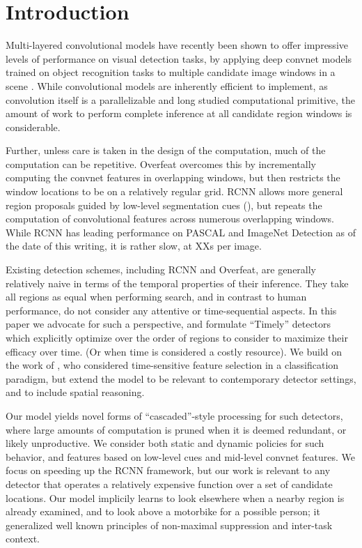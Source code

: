 \section{Introduction}\label{introduction}

Multi-layered convolutional models have recently been shown to offer impressive levels of performance on visual detection tasks, by applying deep convnet models trained on object recognition tasks to multiple candidate image windows in a scene \cite{Sermanet-ICLR-2014,Girshick-CVPR-2014}.
While convolutional models are inherently efficient to implement, as convolution itself is a parallelizable and long studied computational primitive, the amount of work to perform complete inference at all candidate region windows is considerable.

Further, unless care is taken in the design of the computation, much of the computation can be repetitive.
Overfeat overcomes this by incrementally computing the convnet features in overlapping windows, but then restricts the window locations to be on a relatively regular grid. RCNN allows more general region proposals guided by low-level segmentation cues (\cite{Uijlings-IJCV-2013}), but repeats the computation of convolutional features across numerous overlapping windows.
While RCNN has leading performance on PASCAL and ImageNet Detection as of the date of this writing, it is rather slow, at XXs per image.

Existing detection schemes, including RCNN and Overfeat, are generally relatively naive in terms of the temporal properties of their inference.
They take all regions as equal when performing search, and in contrast to human performance, do not consider any attentive or time-sequential aspects.
In this paper we advocate for such a perspective, and formulate ``Timely'' detectors which explicitly optimize over the order of regions to consider to maximize their efficacy over time.
(Or when time is considered a costly resource).
We build on the work of \cite{Karayev-NIPS-2012}, who considered time-sensitive feature selection in a classification paradigm, but extend the model to be relevant to contemporary detector settings, and to include spatial reasoning.

Our model yields novel forms of ``cascaded''-style processing for such detectors, where large amounts of computation is pruned when it is deemed redundant, or likely unproductive.
We consider both static and dynamic policies for such behavior, and features based on low-level cues and mid-level convnet features.
We focus on speeding up the RCNN framework, but our work is relevant to any detector that operates a relatively expensive function over a set of candidate locations.
Our model implicily learns to look elsewhere when a nearby region is already examined, and to look above a motorbike for a possible person; it generalized well known principles of non-maximal suppression and inter-task context.

